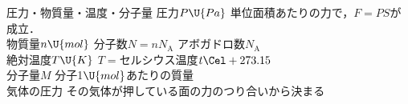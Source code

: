 \begin{matome}{圧力・物質量・温度・分子量}
 \hspace{3mm} 圧力$P\U{Pa}$\hspace{14mm} 単位面積あたりの力で，$F=PS$が成立．\\
\hspace{3mm} 物質量$n\U{mol}$\hspace{10mm} 分子数$N=nN_{\mathrm{A}}$\hspace{10mm} アボガドロ数$N_{\mathrm{A}}$\\
\hspace{3mm} 絶対温度$T\U{K}$\hspace{10mm} $T=$セルシウス温度$t\Cel+273.15$\\
\hspace{4mm}分子量$M$\hspace{16mm} 分子1$\U{mol}$あたりの質量\\
\hspace{3mm} 気体の圧力\hspace{11mm} その気体が押している面の力のつり合いから決まる
\end{matome}

